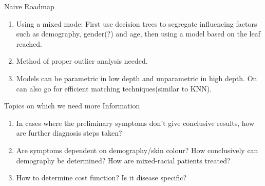 \documentclass{beamer}
\begin{document}

\begin{frame}{Naive Roadmap}

    \begin{enumerate}
        \item Using a mixed mode: First use decision trees to segregate influencing factors such as demography, gender(?) and age, then using a model based on the leaf reached. \pause
        \item Method of proper outlier analysis needed.\pause
        \item Models can be parametric in low depth and unparametric in high depth. On can also go for efficient matching techniques(similar to KNN).
    \end{enumerate}
\end{frame}


\begin{frame}{Topics on which we need more Information}
    \begin{enumerate}
        \item In cases where the preliminary symptoms don't give conclusive results, how are further diagnosis steps taken?
        \item Are symptoms dependent on demography/skin colour? How conclusively can demography be determined? How are mixed-racial patients treated?
        \item How to determine cost function? Is it disease specific?
    \end{enumerate}

\end{frame}
\end{document}
